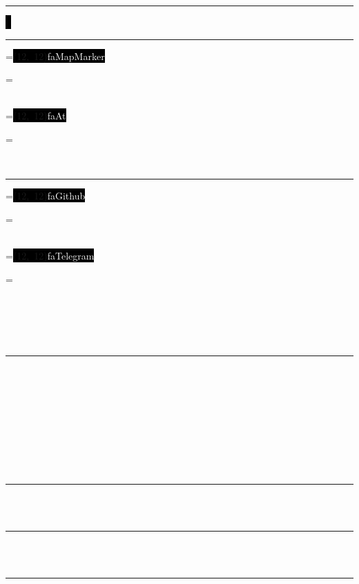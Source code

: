\documentclass[10pt,A4]{article}
\newcommand*{\vcenteredhbox}[1]{\begingroup
	\setbox0=\hbox{#1}\parbox{\wd0}{\box0}\endgroup}
\newcommand{\icon}[2]{\colorbox{black}{\makebox(#2, #2){\textcolor{white}{\large\csname fa#1\endcsname}}}}	%
\newcommand{\icontext}[3]{ 						%
	\vcenteredhbox{\icon{#1}{#2}}\hspace{0.2cm}\vcenteredhbox{\textcolor{black}{#3}}
}
\newcounter{a}
\newcounter{b}
\newcounter{c}
\newcommand{\cvsection}[1] {
	\textcolor{white}{\MakeUppercase{\textbf{#1}}}
}
\newcommand{\cvsect}[1]{
	\colorbox{black}{{\cvsection{#1}}}\\\\%
}
\begin{document}
	
	\begin{minipage}[t]{0.45\textwidth}\hrule height 0pt width 0pt%
		\colorbox{black}{{\Huge\textcolor{white}{\textbf{\MakeUppercase{\cvfirstname\ \cvlastname}}}}}%
		
		\vspace{1mm}\LARGE{\cvposition}
	\end{minipage}%
	\begin{minipage}[t]{0.3\textwidth}\hrule height 0pt width 0pt%
		\small%
		\icontext{MapMarker}{12}{\cvlocation}\\
		\icontext{At}{12}{\href{mailto:\cvmail}{\cvmail}}\\
	\end{minipage}%
	\begin{minipage}[t]{0.3\textwidth}\hrule height 0pt width 0pt%
		\small%
		\icontext{Github}{12}{\href{\cvgithuburl}{\cvgithub}}\\
		\icontext{Telegram}{12}{\href{\cvtelegramurl}{\cvtelegram}}\\
	\end{minipage}%
	
	\small%
	\vspace{0.5cm}
	
	
	\cvsect{\cvtemplatewhoami}%
	\begin{minipage}[t]{0.4\textwidth}%
		\cvhowami
	\end{minipage}%
	\hfill
	\begin{minipage}[t]{0.5\textwidth}\hrule height 0pt width 0pt%
		\vspace{-10pt}%
		\cvprogramminglanguages
	\end{minipage}%
	
	\begin{center}
		\cvareas
	\end{center}
	
	\cvsect{\cvtemplateexperience}
		\cvexperience
	\\\\
	\cvsect{\cvtemplateeducation}
		\cveducation
	\\\\
	\begin{minipage}[t]{0.3\textwidth}\hrule height 0pt width 0pt%
    	\cvsect{\cvtemplatelanguages}
		\cvlanguages
	\end{minipage}%
	\hspace{0cm}
	\begin{minipage}[t]{0.3\textwidth}\hrule height 0pt width 0pt%
		\cvsect{\cvtemplatehobbies}
		\cvhobbies
	\end{minipage}%
	\hspace{2cm}
	\begin{minipage}[t]{0.3\textwidth}\hrule height 0pt width 0pt%
		\cvsect{\cvtemplatenonprofit}
		\cvnonprofit
	\end{minipage}%
	
\end{document}
